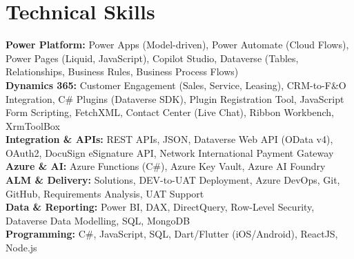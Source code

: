\documentclass[10pt,a4paper]{article}
\begin{document}
\section*{Technical Skills}
\textbf{Power Platform:} Power Apps (Model-driven), Power Automate (Cloud Flows), Power Pages (Liquid, JavaScript), Copilot Studio, Dataverse (Tables, Relationships, Business Rules, Business Process Flows)\\[2pt]
\textbf{Dynamics 365:} Customer Engagement (Sales, Service, Leasing), CRM-to-F\&O Integration, C\# Plugins (Dataverse SDK), Plugin Registration Tool, JavaScript Form Scripting, FetchXML, Contact Center (Live Chat), Ribbon Workbench, XrmToolBox\\[2pt]
\textbf{Integration \& APIs:} REST APIs, JSON, Dataverse Web API (OData v4), OAuth2, DocuSign eSignature API, Network International Payment Gateway\\[2pt]
\textbf{Azure \& AI:} Azure Functions (C\#), Azure Key Vault, Azure AI Foundry\\[2pt]
\textbf{ALM \& Delivery:} Solutions, DEV-to-UAT Deployment, Azure DevOps, Git, GitHub, Requirements Analysis, UAT Support\\[2pt]
\textbf{Data \& Reporting:} Power BI, DAX, DirectQuery, Row-Level Security, Dataverse Data Modelling, SQL, MongoDB\\[2pt]
\textbf{Programming:} C\#, JavaScript, SQL, Dart/Flutter (iOS/Android), ReactJS, Node.js
\end{document}
